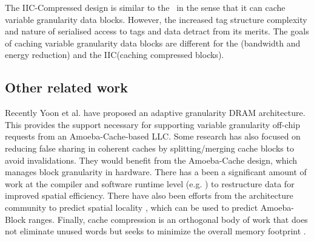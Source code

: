The IIC-Compressed design is similar to the \AC\ in the sense that it can cache variable granularity data blocks. However, the increased tag structure complexity and nature of serialised access to tags and data detract from its merits. The goals of caching variable granularity data blocks are different for the \AC{}(bandwidth and energy reduction) and the IIC(caching compressed blocks). 

\subsection{Other related work}

Recently Yoon et al. have proposed an adaptive granularity DRAM architecture\cite{Yoon_Jeong_Erez_2011}. This provides the support necessary for supporting variable granularity off-chip requests from an Amoeba-Cache-based LLC. Some research \cite{Dubnicki:1992:ABS:139669.139725,Choi:2011:DRM:2120965.2121416} has also focused on reducing false sharing in coherent caches by splitting/merging cache blocks to avoid invalidations. They would benefit from the Amoeba-Cache design, which manages block granularity in hardware. There has a been a significant amount of work at the compiler and software runtime level (e.g. \cite{Chilimbi-Hill-pldi-1999}) to restructure data for improved spatial efficiency. There have also been efforts from the architecture community to predict spatial locality \cite{pujara-hpca-2006, Watkins:2008:RCB:1505816.1505849, kumar-isca-1998, yoon2012dgms}, which can be used to predict Amoeba-Block ranges. Finally, cache compression is an orthogonal body of work that does not eliminate unused words but seeks to minimize the overall memory footprint \cite{AlameldeenPHD}.

